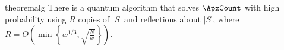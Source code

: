 \begin{restatable}{theorem}{alg}
\label{thm:alg}
There is a quantum algorithm that solves $\ApxCount$ with high probability using
$R$ copies of $|S\>$ and reflections about $|S\>$, where $R = O\left( \min \left\{ w^{1/3} , \sqrt{\frac{N}{w}} \right\} \right)$.
\end{restatable}
